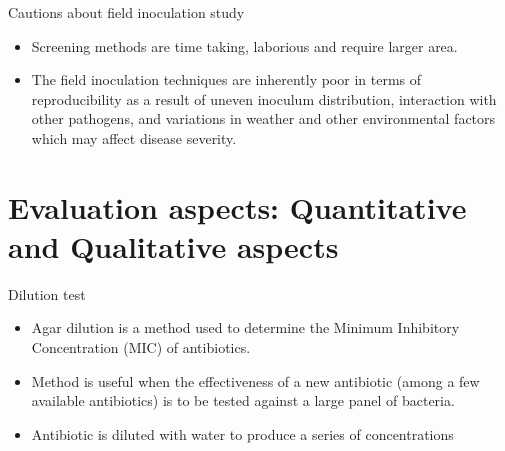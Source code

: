 \documentclass[11pt,dvipsnames,ignorenonframetext,aspectratio=169]{beamer}
\providecommand{\tightlist}{%
  \setlength{\itemsep}{0pt}\setlength{\parskip}{0pt}}
\begin{document}
\begin{frame}{Cautions about field inoculation study}
\protect\hypertarget{cautions-about-field-inoculation-study}{}
\begin{itemize}
\tightlist
\item
  Screening methods are time taking, laborious and require larger area.
\item
  The field inoculation techniques are inherently poor in terms of
  reproducibility as a result of uneven inoculum distribution,
  interaction with other pathogens, and variations in weather and other
  environmental factors which may affect disease severity.
\end{itemize}
\end{frame}

\hypertarget{evaluation-aspects-quantitative-and-qualitative-aspects}{%
\section{Evaluation aspects: Quantitative and Qualitative
aspects}\label{evaluation-aspects-quantitative-and-qualitative-aspects}}

\begin{frame}{Dilution test}
\protect\hypertarget{dilution-test}{}
\begin{itemize}
\tightlist
\item
  Agar dilution is a method used to determine the Minimum Inhibitory
  Concentration (MIC) of antibiotics.
\item
  Method is useful when the effectiveness of a new antibiotic (among a
  few available antibiotics) is to be tested against a large panel of
  bacteria.
\item
  Antibiotic is diluted with water to produce a series of concentrations
\end{itemize}
\end{frame}
\end{document}
